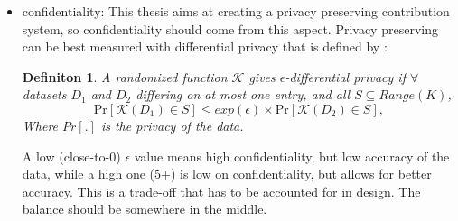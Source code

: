 \documentclass[english, 12pt, a4paper, sci, utf8, a-2b, online]{aaltothesis}
\theoremstyle{change}
\theoremstyle{theoremstyle}
\newtheorem{defi}[theorem]{Definiton}
\begin{document}
\begin{itemize}
\begin{equation*}
    \end{equation*}
    \item confidentiality: This thesis aims at creating a privacy preserving contribution system, so  confidentiality should come from this aspect. 
    Privacy preserving can be best measured with differential privacy that is defined by \cite{bugliesi2006automata}: %
    \begin{defi}
        A randomized function $\mathcal{K}$ gives $\epsilon$-differential privacy if $\forall$ datasets $D_1$ and $D_2$ differing on at most one entry, and all $S \subseteq \textit{Range}(K)$,
        \begin{equation*}
        \text{Pr}[\mathcal{K}(D_1) \in S] \leq exp(\epsilon) \times \text{Pr}[\mathcal{K}(D_2) \in S],
        \end{equation*}
    Where $Pr[.]$ is the privacy of the data.
    \end{defi}
    A low (close-to-0) $\epsilon$ value means high confidentiality, but low accuracy of the data, while a high one (5+) is low on confidentiality, but allows for better accuracy. This is a trade-off that has to be accounted for in design. The balance should be somewhere in the middle.
    

\end{itemize}
\end{document}
